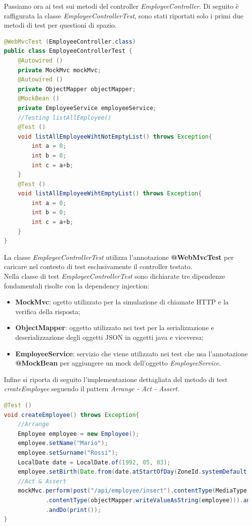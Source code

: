 Passiamo ora ai test sui metodi del controller \textit{EmployeeController}. Di seguito è raffigurata la classe \textit{EmployeeControllerTest}, sono stati riportati solo i primi due metodi di test per questioni di spazio.
\begin{lstlisting}[language=Java, title={EmployeeControllerTest.java}, morecomment={[s][\color{DarkOrchid}]{@}{\ }},  morecomment={[s][\color{OliveGreen}]{"}{"}},]
@WebMvcTest (EmployeeController.class)
public class EmployeeControllerTest {
    @Autowired ()
    private MockMvc mockMvc;
    @Autowired ()
    private ObjectMapper objectMapper;
    @MockBean ()
    private EmployeeService employeeService;
    //Testing listAllEmployee()
    @Test ()
    void listAllEmployeeWihtNotEmptyList() throws Exception{
        int a = 0;
        int b = 0;
        int c = a+b;
    }
    @Test ()
    void listAllEmployeeWihtEmptyList() throws Exception{
        int a = 0;
        int b = 0;
        int c = a+b;
    }
}
\end{lstlisting}
La classe \textit{EmployeeControllerTest} utilizza l'annotazione \textbf{@WebMvcTest} per caricare nel contesto di test esclusivamente il controller testato.\\
Nella classe di test \textit{EmployeeControllerTest} sono dichiarate tre dipendenze fondamentali risolte con la dependency injection:
\begin{itemize}
  \item \textbf{MockMvc}: ogetto utilizzato per la simulazione di chiamate HTTP e la verifica della risposta;
  \item \textbf{ObjectMapper}: oggetto utilizzato nei test per la serializzazione e deserializzazione degli oggetti JSON in oggetti java e viceversa;
  \item \textbf{EmployeeService}: servizio che viene utilizzato nei test che usa l'annotazione \textbf{@MockBean} per aggiungere un mock dell'oggetto \textit{EmployeeService}.
\end{itemize}
Infine si riporta di seguito l'implementazione dettagliata del metodo di test \textit{createEmployee} seguendo il pattern \textit{Arrange - Act - Assert}.
\begin{lstlisting}[language=Java, title={createEmployee()}, morecomment={[s][\color{DarkOrchid}]{@}{\ }},  morecomment={[s][\color{OliveGreen}]{"}{"}},]
@Test ()
void createEmployee() throws Exception{
    //Arrange
    Employee employee = new Employee();
    employee.setName("Mario");
    employee.setSurname("Rossi");
    LocalDate date = LocalDate.of(1992, 05, 03);
    employee.setBirth(Date.from(date.atStartOfDay(ZoneId.systemDefault()).toInstant()));
    //Act & Assert
    mockMvc.perform(post("/api/employee/insert").contentType(MediaType.APPLICATION_JSON)
            .contentType(objectMapper.writeValueAsString(employee))).andExpect(status().isCreated())
            .andDo(print());
}
\end{lstlisting}
